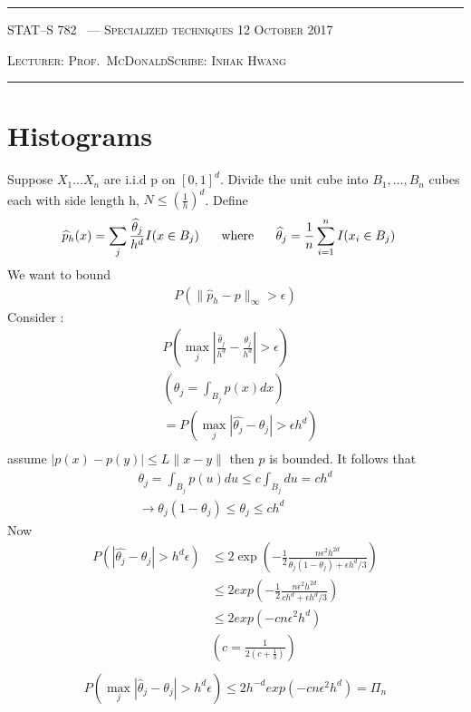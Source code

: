 \documentclass[10pt]{article}
\newcounter{lecnum}
\renewcommand{\hat}{\widehat}
\newcommand{\lecturer}{Prof.\ McDonald}
\newcommand{\scribe}{Inhak Hwang}
\newcommand{\chtitle}{Specialized techniques}
\newcommand{\lecdate}{12 October 2017}
\begin{document}
\rule{6.5in}{1pt}

\textsc{STAT--S 782
        \hfill \thelecnum\ --- \chtitle
        \hfill \lecdate}

\textsc{Lecturer: \lecturer \hfill Scribe: \scribe}
\rule{6.5in}{1pt}

\section{Histograms}
Suppose $X_{1}...X_{n}$ are i.i.d p on $[0,1]^{d}$. Divide the unit cube into $B_{1},...,B_{n}$ cubes each with side length h, $N \le (\frac{1}{h})^{d}$. 
Define 
\begin{align*}
&\hat{p}_{h}(x) = \sum\limits_{j}\frac{\hat{\theta}_{j}}{h^{d}}I(x \in B_{j}) \text{\hspace{0.5cm}  where  \hspace{0.5cm}} \hat{\theta}_{j} = \frac{1}{n}\sum\limits_{i=1}^{n}I(x_{i} \in B_{j})
\end{align*}
We want to bound
\begin{align*}
P(\|\hat{p}_{h} - p \|_{\infty} > \epsilon ) 
\end{align*}
Consider :
\begin{align*}
&P(\max\limits_{j}|\frac{\hat{\theta}_{j}}{h^{d}} - \frac{\theta_{j}}{h^{d}}| > \epsilon) \\
 & (\theta_{j} = \int_{B_{j}}p(x)dx ) \\
&= P(\max\limits_{j}|\hat{\theta_{j}} - \theta_{j}| > \epsilon h^{d}) \\
\end{align*}
assume $|p(x) - p(y) | \le L\|x - y\|$ then $p$ is bounded. 
It follows that
\begin{align*}
\theta_{j} = \int_{B_{j}}p(u)du \le c\int_{B_{j}}du = ch^{d} \\
\rightarrow \theta_{j}(1 - \theta_{j}) \le \theta_{j} \le ch^{d}
\end{align*}
Now
\begin{align*}
P(|\hat{\theta_{j}} - \theta_{j}| > h^{d}\epsilon) &\le 2\exp(-\frac{1}{2}\frac{n\epsilon^{2}h^{2d}}{\theta_{j}(1-\theta_{j}) + \epsilon h^{d} / 3}) \\
&\le 2exp(-\frac{1}{2}\frac{n\epsilon^{2}h^{2d}}{ch^{d}+ \epsilon h^{d} /3}) \\
&\le 2exp(-c n \epsilon^{2} h^{d}) \\
& (c = \frac{1}{2(c+\frac{1}{3})}) \\
\end{align*}
\begin{align*}
P(\max\limits_{j}|\hat{\theta}_{j} - \theta_{j}| > h^{d}\epsilon) \le 2 h^{-d}exp(-cn\epsilon^{2}h^{d}) = \Pi_{n}
\end{align*}
\end{document}
